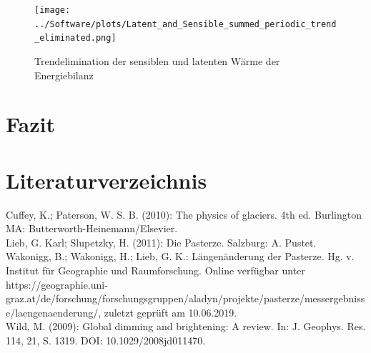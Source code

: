 \documentclass[12pt,a4paper]{article}
\begin{document}
\begin{figure}[H]
\centering
\texttt{[image: ../Software/plots/Latent\_and\_Sensible\_summed\_periodic\_trend\_eliminated.png]}
\caption{Trendelimination der sensiblen und latenten Wärme der Energiebilanz}
\label{fig:Trendelimination der sensiblen und latenten Wärme der Energiebilanz}
\end{figure}






\pagebreak
\section{Fazit}


\pagebreak
\section{Literaturverzeichnis}
Cuffey, K.; Paterson, W. S. B. (2010): The physics of glaciers. 4th ed. Burlington MA: Butterworth-Heinemann/Elsevier.\\

Lieb, G. Karl; Slupetzky, H. (2011): Die Pasterze. Salzburg: A. Pustet.\\

Wakonigg, B.; Wakonigg, H.; Lieb, G. K.: Längenänderung der Pasterze. Hg. v. Institut für Geographie und Raumforschung. Online verfügbar unter https://geographie.uni-graz.at/de/forschung/forschungsgruppen/aladyn/projekte/pasterze/messergebnisse/laengenaenderung/, zuletzt geprüft am 10.06.2019.\\

Wild, M. (2009): Global dimming and brightening: A review. In: J. Geophys. Res. 114, 21, S. 1319. DOI: 10.1029/2008jd011470.
\end{document}
